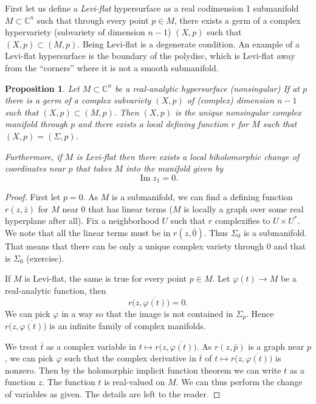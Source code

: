 \documentclass[12pt,openany]{book}
\renewcommand{\Im}{\operatorname{Im}}
\newcommand{\C}{{\mathbb{C}}}
\newcommand{\myindex}[1]{#1\index{#1}}
\theoremstyle{plain}
\newtheorem{prop}[thm]{Proposition}
\theoremstyle{remark}
\theoremstyle{definition}
\theoremstyle{exercise}
\theoremstyle{example}
\begin{document}
First let us define
a \emph{\myindex{Levi-flat}} hypersurface as a real codimension 1
submanifold $M \subset \C^n$ such that through every point $p \in M$,
there exists a germ of a
complex hypervariety (subvariety of dimension $n-1$) $(X,p)$ such that $(X,p)
\subset (M,p)$.  Being Levi-flat is a degenerate condition.
An example of a Levi-flat hypersurface is the 
boundary of the polydisc, which is Levi-flat away from the ``corners'' where it is not a
smooth submanifold.

\begin{prop}
Let $M \subset \C^n$ be a real-analytic hypersurface (nonsingular)
If at $p$ there is a germ of a complex subvariety $(X,p)$ of (complex)
dimension $n-1$ such that $(X,p) \subset (M,p)$.  Then $(X,p)$ is the unique
nonsingular complex manifold through $p$ and there exists a local defining
function $r$ for $M$ such that $(X,p) = (\Sigma,p)$.

Furthermore, if $M$ is Levi-flat
then there exists a local biholomorphic change of coordinates near $p$ that takes
$M$ into the manifold given by
\begin{equation}
\Im z_1 = 0 .
\end{equation}
\end{prop}

\begin{proof}
First let $p=0$.
As $M$ is a submanifold, we can find
a defining function $r(z,\bar{z})$ for $M$ near $0$ that has linear
terms ($M$ is locally a graph over some real hyperplane after all).
Fix a
neighborhood $U$ such that $r$ complexifies to $U \times U^*$.
We note that all the linear terms must be in $r(z,\bar{0})$.  Thus
$\Sigma_0$ is a submanifold.  That means that there can be only a unique
complex variety through $0$ and that is $\Sigma_0$ (exercise).

If $M$ is Levi-flat, the same is true for every point $p \in M$.
Let $\varphi(t) \to M$ be a real-analytic function, then
\begin{equation}
r\bigl(z,\overline{\varphi(t)}\bigr) = 0 .
\end{equation}
We can pick $\varphi$ in a way so that the image is not contained in
$\Sigma_p$.  Hence $r\bigl(z,\overline{\varphi(t)}\bigr)$ is an infinite family
of complex manifolds.

We treat $\bar{t}$ as a complex variable in
$t \mapsto r\bigl(z,\overline{\varphi(t)}\bigr)$.  As 
$r(z,\bar{p})$ is a graph near $p$, we can pick $\varphi$ such that the
complex derivative in $\bar{t}$ of $t \mapsto
r\bigl(z,\overline{\varphi(t)}\bigr)$
is nonzero.  Then by the holomorphic implicit function theorem
we can write $t$ as a function $z$.  The function $t$ is real-valued
on $M$.  We can thus perform the change of variables as given.  The 
details are left to the reader.
\end{proof}
\end{document}
